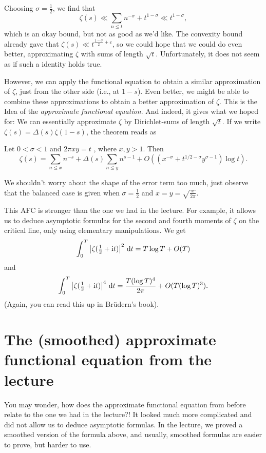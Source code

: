 \documentclass[a4paper,11pt]{article}
\begin{document}
Choosing $\sigma = \frac 12$, we find that 
\[
    \zeta(s) \ll \sum_{n \leq t} n^{-\sigma} + t^{1-\sigma} \ll t^{1- \sigma},
\]
which is an okay bound, but not as good as we'd like. The convexity bound already 
gave that $\zeta(s) \ll t^{\frac{1-\sigma}2 + \varepsilon}$, so we could hope 
that we could do even better, approximating $\zeta$ with sums of length $\sqrt t$.
Unfortunately, it does not seem as if such a identity holds true. 

However, we can apply the functional equation to obtain a similar approximation
of $\zeta$, just from the other side (i.e., at $1-s$). Even better, we might be
able to combine these approximations to obtain a better approximation of 
$\zeta$. This is the Idea of the \textit{approximate functional equation}. 
And indeed, it gives what we hoped for: We can essentially approximate $\zeta$ by
Dirichlet-sums of length $\sqrt t$. If we write $\zeta(s) = \Delta(s) \zeta(1-s)$,
the theorem reads as
\begin{thm}
    Let $0 < \sigma < 1$ and $2 \pi xy = t$ , where $x,y > 1$. Then
    \[
    \zeta(s) = \sum_{n \leq x}n^{-s} + \Delta(s) \sum_{n \leq y} n^{s-1} 
    + O((x^{-\sigma} + t^{1/2-\sigma} y^{\sigma-1}) \log t).
    \]
\end{thm}
We shouldn't worry about the shape of the error term too much, just observe that 
the balanced case is given when $\sigma = \frac 12$ and $x=y= \sqrt{\frac x
{2\pi}}.$ 

This AFC is stronger than the one we had in the lecture. For example, it allows
us to deduce asymptotic formulas for the second and fourth moments of $\zeta$
on the critical line, only using elementary manipulations. We get
\[
    \int_0^T \left\lvert \zeta(\tfrac 12 + \mathrm i t) \right\rvert^2 \mathrm{\,d} t = T \log T + O(T)
\]
and 
\[
    \int_0^T \left\lvert \zeta(\tfrac 12 + \mathrm i t) \right\rvert^4 \mathrm{\,d} t = \frac{T (\log T)^4}{2\pi} + 
    O(T(\log T)^3).
\]
(Again, you can read this up in Brüdern's book).



\section{The (smoothed) approximate functional equation from the lecture} %
\label{sec:Our approximate functional equation}
You may wonder, how does the approximate functional equation from before relate
to the one we had in the lecture?! It looked much more complicated and did not
allow us to deduce asymptotic formulas. In the lecture, we proved a smoothed
version of the formula above, and usually, smoothed formulas are easier to
prove, but harder to use. 

\end{document}
